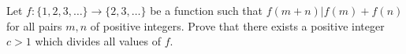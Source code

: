 Let $f: \{1, 2, 3, \dots\} \to \{2, 3, \dots\}$ be a function such that $f(m+n) | f(m) + f(n)$ for all pairs $m, n$ of positive integers. Prove that there exists a positive integer $c>1$ which divides all values of $f$.
